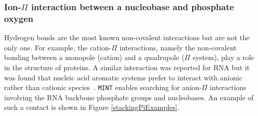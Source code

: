\documentclass[12pt]{article}
\begin{document}
\subsubsection{Ion-$\Pi$ interaction between a nucleobase and phosphate oxygen}
Hydrogen bonds are the most known non-covalent interactions but are not the only one. For example, the cation-$\Pi$ interactions, namely the non-covalent bonding between a monopole (cation) and a quadrupole ($\Pi$ system), play a role in the structure of proteins. A similar interaction was reported for RNA but it was found that nucleic acid aromatic systems prefer to interact with anionic rather than cationic species~\cite{Auffinger2013}. 
{\tt MINT} enables searching for anion-$\Pi$ interactions involving the RNA backbone phosphate groups and nucleobases. An example of such a contact is shown in Figure \ref{stackingPiExamples}.
\end{document}
